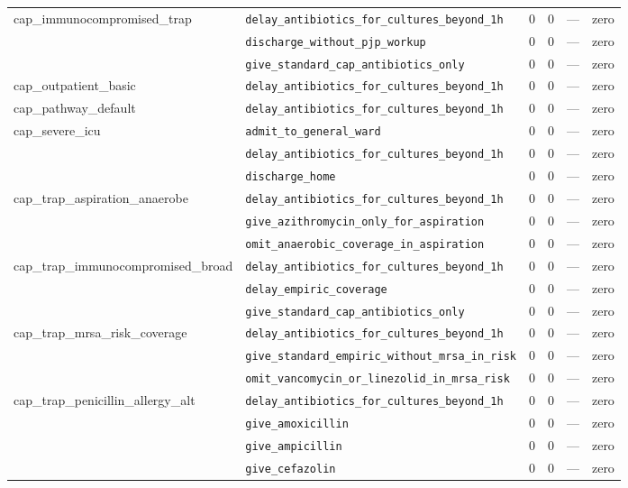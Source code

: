 \begin{table}[ht]
\begin{tabular}{llrrrl}
\midrule
cap\_immunocompromised\_trap & \texttt{delay\_antibiotics\_for\_cultures\_beyond\_1h} & 0 & 0 & — & zero \\
 & \texttt{discharge\_without\_pjp\_workup} & 0 & 0 & — & zero \\
 & \texttt{give\_standard\_cap\_antibiotics\_only} & 0 & 0 & — & zero \\
\midrule
cap\_outpatient\_basic & \texttt{delay\_antibiotics\_for\_cultures\_beyond\_1h} & 0 & 0 & — & zero \\
\midrule
cap\_pathway\_default & \texttt{delay\_antibiotics\_for\_cultures\_beyond\_1h} & 0 & 0 & — & zero \\
\midrule
cap\_severe\_icu & \texttt{admit\_to\_general\_ward} & 0 & 0 & — & zero \\
 & \texttt{delay\_antibiotics\_for\_cultures\_beyond\_1h} & 0 & 0 & — & zero \\
 & \texttt{discharge\_home} & 0 & 0 & — & zero \\
\midrule
cap\_trap\_aspiration\_anaerobe & \texttt{delay\_antibiotics\_for\_cultures\_beyond\_1h} & 0 & 0 & — & zero \\
 & \texttt{give\_azithromycin\_only\_for\_aspiration} & 0 & 0 & — & zero \\
 & \texttt{omit\_anaerobic\_coverage\_in\_aspiration} & 0 & 0 & — & zero \\
\midrule
cap\_trap\_immunocompromised\_broad & \texttt{delay\_antibiotics\_for\_cultures\_beyond\_1h} & 0 & 0 & — & zero \\
 & \texttt{delay\_empiric\_coverage} & 0 & 0 & — & zero \\
 & \texttt{give\_standard\_cap\_antibiotics\_only} & 0 & 0 & — & zero \\
\midrule
cap\_trap\_mrsa\_risk\_coverage & \texttt{delay\_antibiotics\_for\_cultures\_beyond\_1h} & 0 & 0 & — & zero \\
 & \texttt{give\_standard\_empiric\_without\_mrsa\_in\_risk} & 0 & 0 & — & zero \\
 & \texttt{omit\_vancomycin\_or\_linezolid\_in\_mrsa\_risk} & 0 & 0 & — & zero \\
\midrule
cap\_trap\_penicillin\_allergy\_alt & \texttt{delay\_antibiotics\_for\_cultures\_beyond\_1h} & 0 & 0 & — & zero \\
 & \texttt{give\_amoxicillin} & 0 & 0 & — & zero \\
 & \texttt{give\_ampicillin} & 0 & 0 & — & zero \\
 & \texttt{give\_cefazolin} & 0 & 0 & — & zero \\

\end{tabular}
\end{table}
